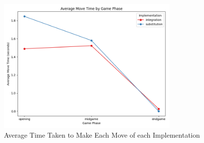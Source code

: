\begin{figure}[H]
    \centering
    \includegraphics[width=0.8\textwidth]{images/plots/implementation/Implementation_vs_avg_move_time_and_phase.png}
    \caption{Average Time Taken to Make Each Move of each Implementation}
    \label{fig: implementation_vs_avg_move_time_and_phase}
\end{figure}


